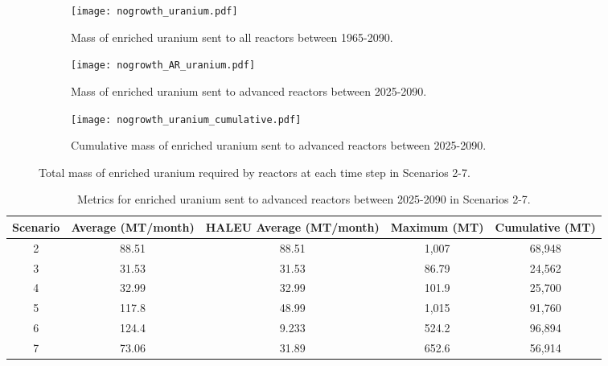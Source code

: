 \begin{figure}
    \centering
    \begin{subfigure}[b]{0.45\textwidth}
        \centering
        \texttt{[image: nogrowth\_uranium.pdf]}
        \caption{Mass of enriched uranium sent to all reactors 
        between 1965-2090.}
        \label{fig:nogrowth_all_uranium}
    \end{subfigure}
    \hfill
    \begin{subfigure}[b]{0.45\textwidth}
        \centering
        \texttt{[image: nogrowth\_AR\_uranium.pdf]}
        \caption{Mass of enriched uranium sent to advanced reactors 
        between 2025-2090.}
        \label{fig:nogrowth_AR_uranium}
    \end{subfigure}
    \begin{subfigure}[b]{0.45\textwidth}
        \centering
        \texttt{[image: nogrowth\_uranium\_cumulative.pdf]}
        \caption{Cumulative mass of enriched 
        uranium sent to advanced reactors between 2025-2090.}
        \label{fig:nogrowth_uranium_cumulative}
    \end{subfigure}
       \caption{Total mass of enriched uranium required by reactors
       at each time step in Scenarios 2-7.}
       \label{fig:nogrowth_uranium}
\end{figure}

\begin{table}
    \centering 
    \caption{Metrics for enriched uranium sent to advanced 
    reactors between 2025-2090 in Scenarios 2-7.}
    \label{tab:nogrowth_uranium}
    \begin{tabular}{c c c c c}
        \hline
        Scenario & Average (MT/month) & \gls{HALEU} Average 
        (MT/month) & Maximum (MT)& Cumulative (MT)\\\hline
        2 & 88.51 & 88.51 & 1,007 & 68,948\\
        3 & 31.53 & 31.53 & 86.79 & 24,562\\
        4 & 32.99 & 32.99 & 101.9 & 25,700\\
        5 & 117.8 & 48.99 & 1,015 & 91,760\\
        6 & 124.4 & 9.233 & 524.2 & 96,894\\
        7 & 73.06 & 31.89 & 652.6 & 56,914\\
        \hline
    \end{tabular}
\end{table}


